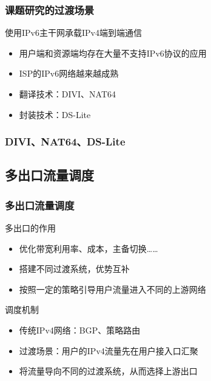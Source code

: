 \documentclass{beamer}
\begin{document}
\begin{frame}
  \frametitle{课题研究的过渡场景}

  \begin{block}{使用IPv6主干网承载IPv4端到端通信}
    \begin{itemize}
    \item 用户端和资源端均存在大量不支持IPv6协议的应用
    \item ISP的IPv6网络越来越成熟
    \item 翻译技术：DIVI、NAT64
    \item 封装技术：DS-Lite
    \end{itemize}
  \end{block}
\end{frame}

\begin{frame}
  \frametitle{DIVI、NAT64、DS-Lite}

\end{frame}

\subsection{多出口流量调度}
\begin{frame}
  \frametitle{多出口流量调度}

  \begin{block}{多出口的作用}
    \begin{itemize}
    \item 优化带宽利用率、成本，主备切换……
    \item 搭建不同过渡系统，优势互补
    \item 按照一定的策略引导用户流量进入不同的上游网络
    \end{itemize}
  \end{block}

  \begin{block}{调度机制}
    \begin{itemize}
    \item 传统IPv4网络：BGP、策略路由
    \item 过渡场景：用户的IPv4流量先在用户接入口汇聚
    \item 将流量导向不同的过渡系统，从而选择上游出口
    \end{itemize}
  \end{block}
\end{frame}
\end{document}
